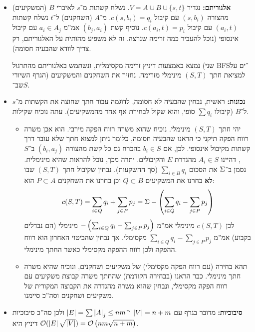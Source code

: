 \documentclass[]{article}
\begin{document}
	\begin{itemize}
		\item \textbf{אלגוריתם: }נגדיר $V = A \cup B \cup \{s, t\}$. נשלח קשתות מ־$s$ לאיברי $B$ (המשקיעים) מהצורה $(s, b_i)$ עם קיבול $c(s, b_i) = q_i$. מ־$A$ (השחקנים) ל־$t$ נשלח קשתות $(a_i, t)$ עם קיבול $c(a_i, t) = p_i$. נוסיף קשת $(b_j, a_i)$ אמ''מ $a_i \in A_j$ עם קיבול אינסופי (נוכל להעביר כמה זרימה שנרצה. זה לא משפיע מהותית על האלגוריתם, רק צריך לוודא שהבעיה חסומה). 
		
		נמצא באמצעות דיניץ זרימה מקסימלית, ונשתמש באלגוריתם מהתרגול (שני BFS־ים על הגרף השיורי) למציאת חתך $(S, T)$ מינימלי מזרימה. נחזיר את השחקנים והמשקיעים שב־$S$. 
		\item \textbf{נכונות: }ראשית, נבחין שהבעיה לא חסומה, לדוגמה עבור חתך שחוצה את הקשתות מ־$s$ ל־$B$ (קיבולו $\sum q_i$ סופי, והוא שקול לבחירת אף אחד מהמשקיעים). עתה נוכיח שקילות. 
		\begin{itemize}
			\item[$\implies$] יהי חתך $(S, T)$ מינימלי. נוכיח שהוא משרה רווח הפקה מירבי. הוא  אכן משרה רווח הפקה תיקני כי הראנו שהבעיה חסומה, כלומר ניתן למצוא חתך שלא עובר דרך קשתות מקיבול אינסופי. לכן, אם $b_i \in S$ בהכרח גם כל קשת מהצורה $(b_i, a_j)$ ב־$S$, דהיינו $A_i \in S$ מהגדרת $E$ והקיבולים. יתרה מכך, נוכל להראות שהיא מינימלית. נסמן ב־$\Sigma$ את הסכום $\sum_{i \in B}q_i$ (סך ההשקעות). 
			נבחין שקיבול חתך $(S, T)$ שבו \textbf{לא} בחרנו את המשקיעים $Q \subset B$ וכן בחרנו את השחקנים $P \subset A$ הוא: 
			\[ c(S, T) = \sum_{i \in Q}q_i + \sum_{j \in P}p_j = \Sigma - \left ( \sum_{i \in Q}q_i - \sum_{j \in P}p_j \right ) \]
			לכן $c(S, T)$ מינימלי אמ''מ $- \left ( \sum_{i \in Q}q_i - \sum_{j \in P}p_j \right )$ מינימלי (הם נבדלים בקבוע) אמ''מ $\sum_{i \in Q}q_i - \sum_{j \in P}p_j$ מקסימלי. אך נבחין שהביטוי האחרון הוא רווח ההפקה ולכן רווח ההפקה מקסימלי כאשר החתך מינימלי. 
			\item[$\impliedby$]תהא בחירה (עם רווח הפקה מקסימלי) של משקיעים ושחקנים, ונוכיח שהיא משרה חתך מינימלי. כבר הראנו (בבחירה הקודמת) שהחתך משרה קבוצת משקיעים עם רווח הפקה מקסימלי, ונבחין שהוא משרה מהגדרה את הקבוצה המקורית של משקיעים ושחקנים וסה''כ סיימנו. 
		\end{itemize}
		\item \textbf{סיבוכיות: }מדובר בגרף עם $\left \lvert V \right \rvert = n + m$ ו־$\left \lvert E \right \rvert = \sum \left \lvert A \right \rvert_j \le nm$ ולכן סה''כ סיבוכיות דיניץ היא $\mathcal{O}(\left \lvert E \right \rvert \sqrt {\left \lvert V \right \rvert}) = \mathcal{O}\left ( nm\sqrt{n + m} \right )$. 
	\end{itemize}
	
	
\end{document}
